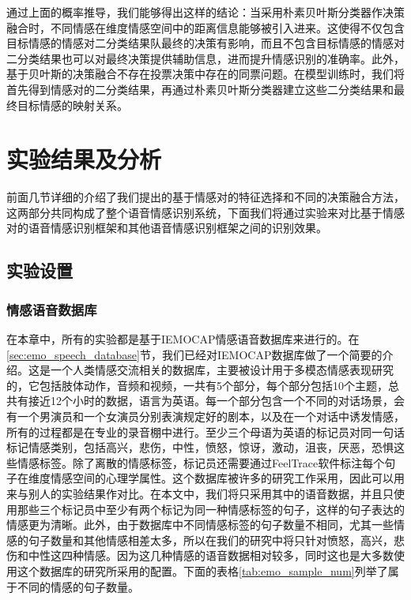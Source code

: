 通过上面的概率推导，我们能够得出这样的结论：当采用朴素贝叶斯分类器作决策融合时，不同情感在维度情感空间中的距离信息能够被引入进来。这使得不仅包含目标情感的情感对二分类结果队最终的决策有影响，而且不包含目标情感的情感对二分类结果也可以对最终决策提供辅助信息，进而提升情感识别的准确率。此外，基于贝叶斯的决策融合不存在投票决策中存在的同票问题。在模型训练时，我们将首先得到情感对的二分类结果，再通过朴素贝叶斯分类器建立这些二分类结果和最终目标情感的映射关系。

\section{实验结果及分析}
\label{sec:experiment}

前面几节详细的介绍了我们提出的基于情感对的特征选择和不同的决策融合方法，这两部分共同构成了整个语音情感识别系统，下面我们将通过实验来对比基于情感对的语音情感识别框架和其他语音情感识别框架之间的识别效果。

\subsection{实验设置}
\label{ssec:experiment_setup}

\subsubsection{情感语音数据库}
\label{sssec:speech_database}

在本章中，所有的实验都是基于IEMOCAP情感语音数据库来进行的。在\ref{sec:emo_speech_database}节，我们已经对IEMOCAP数据库做了一个简要的介绍。这是一个人类情感交流相关的数据库，主要被设计用于多模态情感表现研究的，它包括肢体动作，音频和视频，一共有5个部分，每个部分包括10个主题，总共有接近12个小时的数据，语言为英语。每一个部分包含一个不同的对话场景，会有一个男演员和一个女演员分别表演规定好的剧本，以及在一个对话中诱发情感，所有的过程都是在专业的录音棚中进行。至少三个母语为英语的标记员对同一句话标记情感类别，包括高兴，悲伤，中性，愤怒，惊讶，激动，沮丧，厌恶，恐惧这些情感标签。除了离散的情感标签，标记员还需要通过FeelTrace软件标注每个句子在维度情感空间的心理学属性。这个数据库被许多的研究工作采用，因此可以用来与别人的实验结果作对比。在本文中，我们将只采用其中的语音数据，并且只使用那些三个标记员中至少有两个标记为同一种情感标签的句子，这样的句子表达的情感更为清晰。此外，由于数据库中不同情感标签的句子数量不相同，尤其一些情感的句子数量和其他情感相差太多，所以在我们的研究中将只针对愤怒，高兴，悲伤和中性这四种情感。因为这几种情感的语音数据相对较多，同时这也是大多数使用这个数据库的研究所采用的配置。下面的表格\ref{tab:emo_sample_num}列举了属于不同的情感的句子数量。

